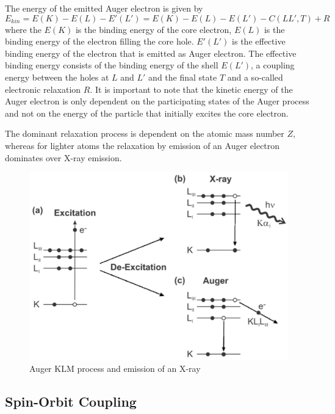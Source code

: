 \documentclass[a4paper,10pt]{scrartcl}
\begin{document}
The energy of the emitted Auger electron is given by
\begin{equation}
E_{kin} = E(K)-E(L)-E'(L') = E(K)-E(L)-E(L')-C(LL',T)+R
\end{equation}
where the $E(K)$ is the binding energy of the core electron, $E(L)$ is the binding energy of the electron filling the core hole. $E'(L')$ is the effective binding energy of the electron that is emitted as Auger electron. The effective binding energy consists of the binding energy of the shell $E(L')$, a coupling energy between the holes at $L$ and $L'$ and the final state $T$ and a so-called electronic relaxation $R$. It is important to note that the kinetic energy of the Auger electron is only dependent on the participating states of the Auger process and not on the energy of the particle that initially excites the core electron.

The dominant relaxation process is dependent on the atomic mass number $Z$, whereas for lighter atoms the relaxation by emission of an Auger electron dominates over X-ray emission.

\begin{figure}
\centering
\includegraphics[scale=0.4]{img/auger}
\caption{Auger KLM process and emission of an X-ray \label{fig:aauger}}
\end{figure}


\subsection{Spin-Orbit Coupling}
\end{document}
